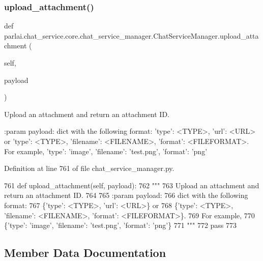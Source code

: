 \subsubsection{\texorpdfstring{upload\+\_\+attachment()}{upload\_attachment()}}
{\footnotesize\ttfamily def parlai.\+chat\+\_\+service.\+core.\+chat\+\_\+service\+\_\+manager.\+Chat\+Service\+Manager.\+upload\+\_\+attachment (\begin{DoxyParamCaption}\item[{}]{self,  }\item[{}]{payload }\end{DoxyParamCaption})}

\begin{DoxyVerb}Upload an attachment and return an attachment ID.

:param payload:
    dict with the following format:
{'type': <TYPE>, 'url': <URL>} or
{'type': <TYPE>, 'filename': <FILENAME>, 'format': <FILEFORMAT>}.
For example,
{'type': 'image', 'filename': 'test.png', 'format': 'png'}
\end{DoxyVerb}
 

Definition at line 761 of file chat\+\_\+service\+\_\+manager.\+py.


\begin{DoxyCode}
761     \textcolor{keyword}{def }upload\_attachment(self, payload):
762         \textcolor{stringliteral}{"""}
763 \textcolor{stringliteral}{        Upload an attachment and return an attachment ID.}
764 \textcolor{stringliteral}{}
765 \textcolor{stringliteral}{        :param payload:}
766 \textcolor{stringliteral}{            dict with the following format:}
767 \textcolor{stringliteral}{                \{'type': <TYPE>, 'url': <URL>\} or}
768 \textcolor{stringliteral}{                \{'type': <TYPE>, 'filename': <FILENAME>, 'format': <FILEFORMAT>\}.}
769 \textcolor{stringliteral}{                For example,}
770 \textcolor{stringliteral}{                \{'type': 'image', 'filename': 'test.png', 'format': 'png'\}}
771 \textcolor{stringliteral}{        """}
772         \textcolor{keywordflow}{pass}
773 \end{DoxyCode}


\subsection{Member Data Documentation}
\mbox{\label{classparlai_1_1chat__service_1_1core_1_1chat__service__manager_1_1ChatServiceManager_a3bfa14f0b887a82a34379087c64afda5}} 
